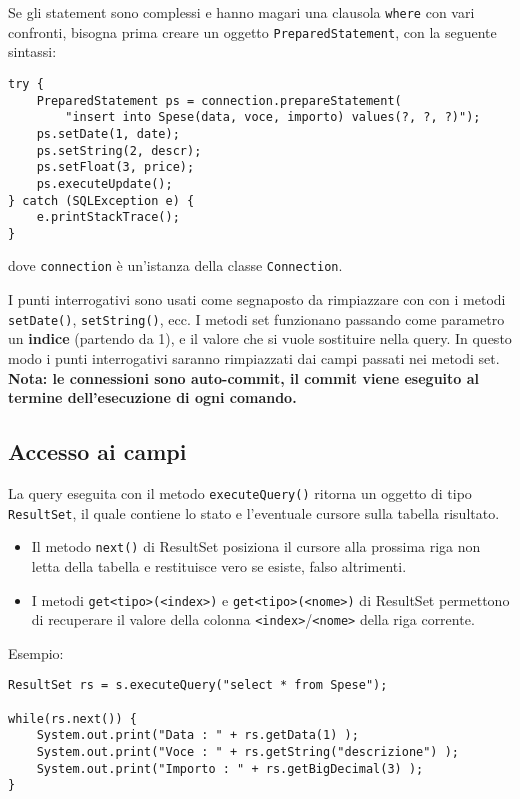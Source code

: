 \documentclass[a4paper, 10pt, titlepage]{article}
\begin{document}
Se gli statement sono complessi e hanno magari una clausola \lstinline|where| con vari confronti, bisogna prima creare un oggetto \lstinline|PreparedStatement|, con la seguente sintassi:

\begin{lstlisting}
try {
	PreparedStatement ps = connection.prepareStatement(
		"insert into Spese(data, voce, importo) values(?, ?, ?)");
	ps.setDate(1, date);
	ps.setString(2, descr);
	ps.setFloat(3, price);
	ps.executeUpdate();
} catch (SQLException e) {
	e.printStackTrace();
}
\end{lstlisting}
dove \lstinline|connection| è un'istanza della classe \lstinline|Connection|. 

I punti interrogativi sono usati come segnaposto da rimpiazzare con con i metodi \lstinline|setDate()|, \lstinline|setString()|, ecc.
I metodi set funzionano passando come parametro un \textbf{indice} (partendo da 1), e il valore che si vuole sostituire nella query.
In questo modo i punti interrogativi saranno rimpiazzati dai campi passati nei metodi set. \\
\textbf{Nota: le connessioni sono auto-commit, il commit viene eseguito al termine dell'esecuzione di ogni comando.}

\subsection{Accesso ai campi}
La query eseguita con il metodo \lstinline|executeQuery()| ritorna un oggetto di tipo \lstinline|ResultSet|, il quale contiene lo stato e l'eventuale cursore sulla tabella risultato.
\begin{itemize}
\item Il metodo \lstinline|next()| di ResultSet posiziona il cursore alla prossima riga non letta della tabella e restituisce vero se esiste, falso altrimenti.
\item I metodi \lstinline|get<tipo>(<index>)| e \lstinline|get<tipo>(<nome>)| di ResultSet permettono di recuperare il valore della colonna \lstinline|<index>|/\lstinline|<nome>| della riga corrente.
\end{itemize}
Esempio:
\begin{lstlisting}
ResultSet rs = s.executeQuery("select * from Spese");

while(rs.next()) {
	System.out.print("Data : " + rs.getData(1) );
	System.out.print("Voce : " + rs.getString("descrizione") );
	System.out.print("Importo : " + rs.getBigDecimal(3) );
}
\end{lstlisting}
\end{document}
